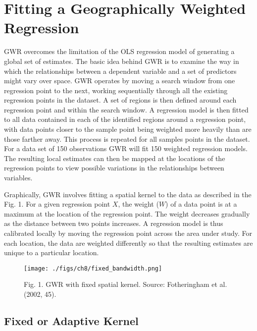 \documentclass[
  letterpaper,
  krantz2]{style/krantz}
\begin{document}
\hypertarget{fitting-a-geographically-weighted-regression}{%
\section{Fitting a Geographically Weighted
Regression}\label{fitting-a-geographically-weighted-regression}}

GWR overcomes the limitation of the OLS regression model of generating a
global set of estimates. The basic idea behind GWR is to examine the way
in which the relationships between a dependent variable and a set of
predictors might vary over space. GWR operates by moving a search window
from one regression point to the next, working sequentially through all
the existing regression points in the dataset. A set of regions is then
defined around each regression point and within the search window. A
regression model is then fitted to all data contained in each of the
identified regions around a regression point, with data points closer to
the sample point being weighted more heavily than are those farther
away. This process is repeated for all samples points in the dataset.
For a data set of 150 observations GWR will fit 150 weighted regression
models. The resulting local estimates can then be mapped at the
locations of the regression points to view possible variations in the
relationships between variables.

Graphically, GWR involves fitting a spatial kernel to the data as
described in the Fig. 1. For a given regression point \(X\), the weight
(\(W\)) of a data point is at a maximum at the location of the
regression point. The weight decreases gradually as the distance between
two points increases. A regression model is thus calibrated locally by
moving the regression point across the area under study. For each
location, the data are weighted differently so that the resulting
estimates are unique to a particular location.

\begin{figure}

{\centering \texttt{[image: ./figs/ch8/fixed\_bandwidth.png]}

}

\caption{Fig. 1. GWR with fixed spatial kernel. Source: Fotheringham et
al. (2002, 45).}

\end{figure}

\hypertarget{fixed-or-adaptive-kernel}{%
\subsection{Fixed or Adaptive Kernel}\label{fixed-or-adaptive-kernel}}
\end{document}
